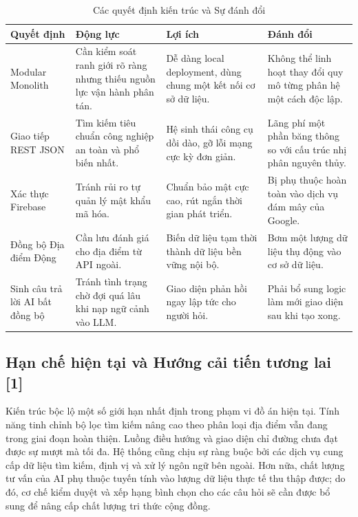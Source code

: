 \documentclass[12pt, a4paper]{article}
\begin{document}
\begin{table}[H]
    \centering
    \renewcommand{\arraystretch}{1.3}
    \begin{tabular}{|p{3.5cm}|p{3.5cm}|p{3.5cm}|p{3.5cm}|}
    \hline
    \textbf{Quyết định} & \textbf{Động lực} & \textbf{Lợi ích} & \textbf{Đánh đổi} \\
    \hline
    Modular Monolith & Cần kiểm soát ranh giới rõ ràng nhưng thiếu nguồn lực vận hành phân tán. & Dễ dàng local deployment, dùng chung một kết nối cơ sở dữ liệu. & Không thể linh hoạt thay đổi quy mô từng phân hệ một cách độc lập. \\
    \hline
    Giao tiếp REST JSON & Tìm kiếm tiêu chuẩn công nghiệp an toàn và phổ biến nhất. & Hệ sinh thái công cụ dồi dào, gỡ lỗi mạng cực kỳ đơn giản. & Lãng phí một phần băng thông so với cấu trúc nhị phân nguyên thủy. \\
    \hline
    Xác thực Firebase & Tránh rủi ro tự quản lý mật khẩu mã hóa. & Chuẩn bảo mật cực cao, rút ngắn thời gian phát triển. & Bị phụ thuộc hoàn toàn vào dịch vụ đám mây của Google. \\
    \hline
    Đồng bộ Địa điểm Động & Cần lưu đánh giá cho địa điểm từ API ngoài. & Biến dữ liệu tạm thời thành dữ liệu bền vững nội bộ. & Bơm một lượng dữ liệu thụ động vào cơ sở dữ liệu. \\
    \hline
    Sinh câu trả lời AI bất đồng bộ & Tránh tình trạng chờ đợi quá lâu khi nạp ngữ cảnh vào LLM. & Giao diện phản hồi ngay lập tức cho người hỏi. & Phải bổ sung logic làm mới giao diện sau khi tạo xong. \\
    \hline
    \end{tabular}
    \caption{Các quyết định kiến trúc và Sự đánh đổi}
    \label{tab:arch_tradeoffs}
\end{table}

\subsection[Hạn chế hiện tại và Hướng cải tiến tương lai]{Hạn chế hiện tại và Hướng cải tiến tương lai \,{\normalfont\small\textcolor{cyan!70!black}{[1]}}}
Kiến trúc bộc lộ một số giới hạn nhất định trong phạm vi đồ án hiện tại. Tính năng tinh chỉnh bộ lọc tìm kiếm nâng cao theo phân loại địa điểm vẫn đang trong giai đoạn hoàn thiện. Luồng điều hướng và giao diện chỉ đường chưa đạt được sự mượt mà tối đa. Hệ thống cũng chịu sự ràng buộc bởi các dịch vụ cung cấp dữ liệu tìm kiếm, định vị và xử lý ngôn ngữ bên ngoài. Hơn nữa, chất lượng tư vấn của AI phụ thuộc tuyến tính vào lượng dữ liệu thực tế thu thập được; do đó, cơ chế kiểm duyệt và xếp hạng bình chọn cho các câu hỏi sẽ cần được bổ sung để nâng cấp chất lượng tri thức cộng đồng.
\end{document}
